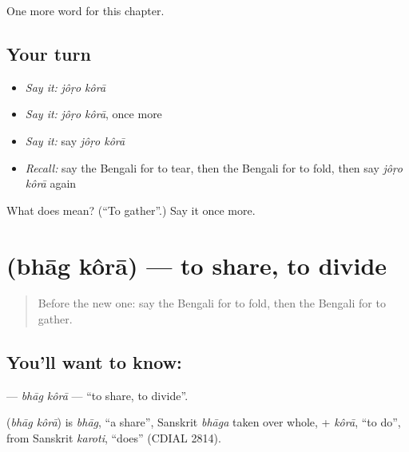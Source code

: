 \begin{grammarlens}[title={What you've built}]
One more word for this chapter.
\end{grammarlens}

\subsection*{Your turn}
\begin{itemize}
\raggedright
  \item \emph{Say it:} \emph{jôṛo kôrā}
  \item \emph{Say it:} \emph{jôṛo kôrā}, once more
  \item \emph{Say it:} say \emph{jôṛo kôrā}
  \item \emph{Recall:} say the Bengali for to tear, then the Bengali for to fold, then say \emph{jôṛo kôrā} again
\end{itemize}

\begin{tcolorbox}[breakable,colback=teal!4,colframe=teal!35!black,title={Before you move on}]
What does   mean? (\textquotedblleft{}To gather\textquotedblright{}.) Say it once more.
\end{tcolorbox}
\section[\texorpdfstring{\bn{ভাগ} \bn{করা} (bhāg kôrā)}{ভাগ করা (bhāg kôrā)}]{  (bhāg kôrā) — to share, to divide}

\label{lesson:BN-C182-bhag-kora}



\begin{quote}
Before the new one: say the Bengali for to fold, then the Bengali for to gather.
\end{quote}

\subsection*{You'll want to know:  }
\textbf{ } — \emph{bhāg kôrā} — \textquotedblleft{}to share, to divide\textquotedblright{}.

\begin{cousinweb}
\textbf{ } (\emph{bhāg kôrā}) is \emph{bhāg}, \textquotedblleft{}a share\textquotedblright{}, Sanskrit \emph{bhāga} taken over whole, + \emph{kôrā}, \textquotedblleft{}to do\textquotedblright{}, from Sanskrit \emph{karoti}, \textquotedblleft{}does\textquotedblright{} (CDIAL 2814).
\end{cousinweb}

